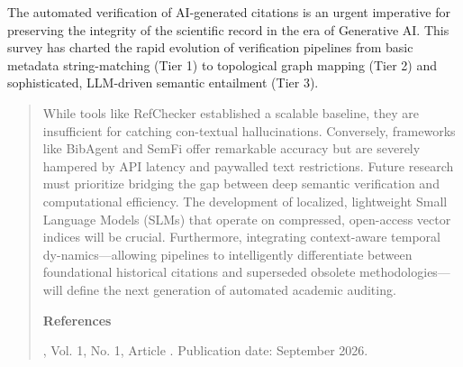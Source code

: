 \documentclass[
]{article}
\begin{document}
The automated verification of AI-generated citations is an urgent
imperative for preserving the integrity of the scientific record in the
era of Generative AI. This survey has charted the rapid evolution of
verification pipelines from basic metadata string-matching (Tier 1) to
topological graph mapping (Tier 2) and sophisticated, LLM-driven
semantic entailment (Tier 3).

\begin{quote}
While tools like RefChecker established a scalable baseline, they are
insufficient for catching con-textual hallucinations. Conversely,
frameworks like BibAgent and SemFi offer remarkable accuracy but are
severely hampered by API latency and paywalled text restrictions. Future
research must prioritize bridging the gap between deep semantic
verification and computational efficiency. The development of localized,
lightweight Small Language Models (SLMs) that operate on compressed,
open-access vector indices will be crucial. Furthermore, integrating
context-aware temporal dy-namics---allowing pipelines to intelligently
differentiate between foundational historical citations and superseded
obsolete methodologies---will define the next generation of automated
academic auditing.

\textbf{References}

, Vol. 1, No. 1, Article . Publication date: September 2026.
\end{quote}
\end{document}
